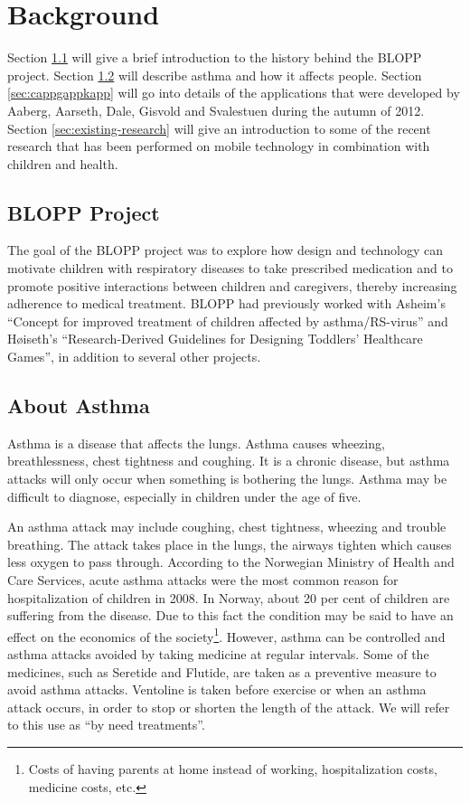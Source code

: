 \chapter{Background}
\label{chp:background}

Section \ref{sec:bloppproject} will give a brief introduction to the history behind the BLOPP project. Section \ref{sec:about-asthma} will describe asthma and how it affects people. Section \ref{sec:cappgappkapp} will go into details of the applications that were developed by Aaberg, Aarseth, Dale, Gisvold and Svalestuen during the autumn of 2012.     
Section \ref{sec:existing-research} will give an introduction to some of the recent research that has been performed on mobile technology in combination with children and health.   


\section{BLOPP Project}
\label{sec:bloppproject}
The goal of the BLOPP project was to explore how design and technology can motivate children with respiratory diseases to take prescribed medication and to promote positive interactions between children and caregivers, thereby increasing adherence to medical treatment. BLOPP had previously worked with Asheim's ``Concept for improved treatment of children affected by asthma/RS-virus''\cite{asheim2012konsept} and H\o iseth's ``Research-Derived Guidelines for Designing Toddlers' Healthcare Games''\cite{hoiseth2013research}, in addition to several other projects.


\section{About Asthma}
\label{sec:about-asthma}
Asthma is a disease that affects the lungs. Asthma causes wheezing, breathlessness, chest tightness and coughing. It is a chronic disease, but asthma attacks will only occur when something is bothering the lungs. Asthma may be difficult to diagnose, especially in children under the age of five. 


An asthma attack may include coughing, chest tightness, wheezing and trouble breathing. The attack takes place in the lungs, the airways tighten which causes less oxygen to pass through.
According to the Norwegian Ministry of Health and Care Services, acute asthma attacks were the most common reason for hospitalization of children in 2008\cite{NationalStrategy}. In Norway, about 20 per cent of children are suffering from the disease. Due to this fact the condition may be said to have an effect on the economics of the society\footnote{Costs of having parents at home instead of working, hospitalization costs, medicine costs, etc.}. However, asthma can be controlled and asthma attacks avoided by taking medicine at regular intervals. Some of the medicines, such as Seretide and Flutide, are taken as a preventive measure to avoid asthma attacks. Ventoline is taken before exercise or when an asthma attack occurs, in order to stop or shorten the length of the attack. We will refer to this use as ``by need treatments''. 

